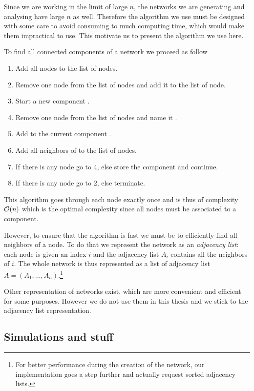 \documentclass[
11pt, %
english, %
singlespacing, %
nolistspacing, %
liststotoc, %
headsepline, %
]{MastersDoctoralThesis} %
\begin{document}
Since we are working in the limit of large $n$, the networks we are generating and analysing have large $n$ as well. Therefore the algorithm we use must be designed with some care to avoid consuming to much computing time, which would make them impractical to use. This motivate us to present the algorithm we use here.

To find all connected components of a network we proceed as follow
\begin{enumerate}
	\item Add all nodes to the list of  nodes.
	\item Remove one node from the list of  nodes and add it to the list of  node.
	\item Start a new component .
	\item Remove one node from the list of  nodes and name it .
	\item Add  to the current component .
	\item Add all  neighbors of  to the list of  nodes.
	\item If there is any  node go to 4, else store the component  and continue.
	\item If there is any  node go to 2, else terminate.
\end{enumerate}
This algorithm goes through each node exactly once and is thus of complexity $\mathcal{O}\!\left(n\right)$ which is the optimal complexity since all nodes must be associated to a component.

However, to ensure that the algorithm is fast we must be to efficiently find all neighbors of a node. To do that we represent the network as an \emph{adjacency list}: each node is given an index $i$ and the adjacency list $A_i$ contains all the neighbors of $i$. The whole network is thus represented as a list of adjacency list $A = (A_1, \dots, A_n)$.\footnote{For better performance during the creation of the network, our implementation goes a step further and actually request sorted adjacency lists.}

Other representation of networks exist, which are more convenient and efficient for some purposes. However we do not use them in this thesis and we stick to the adjacency list representation.

\subsection{Simulations and stuff}
\end{document}
